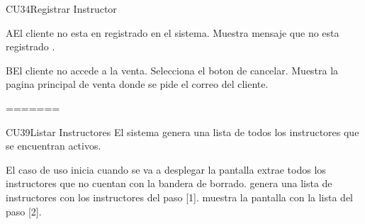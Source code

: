 \begin{UseCase}{CU34}{Registrar Instructor}
{%
		\begin{UCtrayectoriaA}{A}{El cliente no esta en registrado en el sistema.}
			\UCpaso Muestra mensaje que no esta registrado .
		\end{UCtrayectoriaA}
		\begin{UCtrayectoriaA}{B}{El cliente no accede a la venta.}
			\UCpaso[\UCactor] Selecciona el boton de cancelar.
			\UCpaso Muestra la pagina principal de venta donde se pide el correo del cliente.
		\end{UCtrayectoriaA}
		


=======




\begin{UseCase}{CU39}{Listar Instructores}{
		El sistema genera una lista de todos los instructores que se encuentran activos.
	}
\end{UseCase}
\begin{UCtrayectoria}{El caso de uso inicia cuando se va a desplegar la pantalla }
	\UCpaso extrae todos los instructores que no cuentan con la bandera de borrado.
	\UCpaso genera una lista de instructores con los instructores del paso [1].
	\UCpaso muestra la pantalla   con la lista del paso [2].
\end{UCtrayectoria}

}
\end{UseCase}
